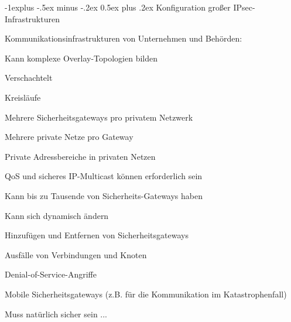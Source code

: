 \documentclass[a4paper]{article}
\makeatletter
\renewcommand{\subsection}{\@startsection{subsection}{2}{0mm}%
 {-1explus -.5ex minus -.2ex}%
 {0.5ex plus .2ex}%
 {\normalfont\normalsize\bfseries}}
\makeatother
\begin{document}
\begin{multicols}{3}
      \subsection{Konfiguration großer IPsec-Infrastrukturen}
      \begin{itemize*}
            \item Kommunikationsinfrastrukturen von Unternehmen und Behörden:
            \item Kann komplexe Overlay-Topologien bilden
            \begin{itemize*}
                  \item Verschachtelt
                  \item Kreisläufe
                  \item Mehrere Sicherheitsgateways pro privatem Netzwerk
                  \item Mehrere private Netze pro Gateway
                  \item Private Adressbereiche in privaten Netzen
                  \item QoS und sicheres IP-Multicast können erforderlich sein
            \end{itemize*}
            \item Kann bis zu Tausende von Sicherheits-Gateways haben
            \item Kann sich dynamisch ändern
            \begin{itemize*}
                  \item Hinzufügen und Entfernen von Sicherheitsgateways
                  \item Ausfälle von Verbindungen und Knoten
                  \item Denial-of-Service-Angriffe
                  \item Mobile Sicherheitsgateways (z.B. für die Kommunikation im Katastrophenfall)
            \end{itemize*}
            \item Muss natürlich sicher sein ...
      \end{itemize*}


\end{multicols}
\end{document}
